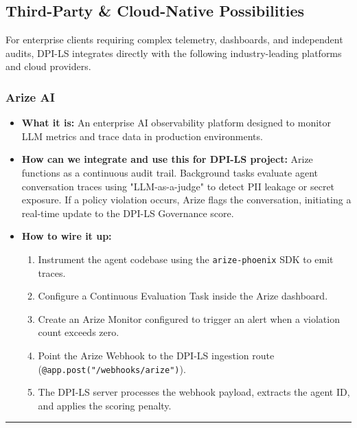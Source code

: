 \documentclass[11pt,a4paper]{article}
\begin{document}
\subsection{Third-Party \& Cloud-Native Possibilities}

For enterprise clients requiring complex telemetry, dashboards, and independent audits, DPI-LS integrates directly with the following industry-leading platforms and cloud providers.

\subsubsection*{Arize AI}
\begin{itemize}
    \item \textbf{What it is:} An enterprise AI observability platform designed to monitor LLM metrics and trace data in production environments.
    \item \textbf{How can we integrate and use this for DPI-LS project:} Arize functions as a continuous audit trail. Background tasks evaluate agent conversation traces using "LLM-as-a-judge" to detect PII leakage or secret exposure. If a policy violation occurs, Arize flags the conversation, initiating a real-time update to the DPI-LS Governance score.
    \item \textbf{How to wire it up:}
    \begin{enumerate}
        \item Instrument the agent codebase using the \texttt{arize-phoenix} SDK to emit traces.
        \item Configure a Continuous Evaluation Task inside the Arize dashboard.
        \item Create an Arize Monitor configured to trigger an alert when a violation count exceeds zero.
        \item Point the Arize Webhook to the DPI-LS ingestion route (\texttt{@app.post("/webhooks/arize")}).
        \item The DPI-LS server processes the webhook payload, extracts the agent ID, and applies the scoring penalty.
    \end{enumerate}
\end{itemize}

\vspace{0.2cm}\hrule\vspace{0.2cm}
\end{document}
